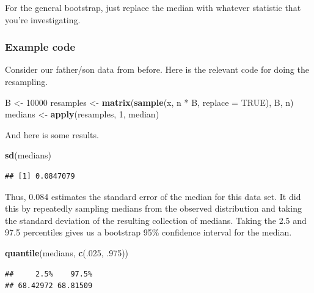 \documentclass[]{article}
\newenvironment{Shaded}{\begin{snugshade}}{\end{snugshade}}
\newcommand{\KeywordTok}[1]{\textcolor[rgb]{0.13,0.29,0.53}{\textbf{{#1}}}}
\newcommand{\DataTypeTok}[1]{\textcolor[rgb]{0.13,0.29,0.53}{{#1}}}
\newcommand{\DecValTok}[1]{\textcolor[rgb]{0.00,0.00,0.81}{{#1}}}
\newcommand{\StringTok}[1]{\textcolor[rgb]{0.31,0.60,0.02}{{#1}}}
\newcommand{\OtherTok}[1]{\textcolor[rgb]{0.56,0.35,0.01}{{#1}}}
\newcommand{\NormalTok}[1]{{#1}}
\begin{document}
For the general bootstrap, just replace the median with whatever
statistic that you're investigating.

\subsubsection{Example code}\label{example-code}

Consider our father/son data from before. Here is the relevant code for
doing the resampling.

\begin{Shaded}
\begin{Highlighting}[]
\NormalTok{B <-}\StringTok{ }\DecValTok{10000}
\NormalTok{resamples <-}\StringTok{ }\KeywordTok{matrix}\NormalTok{(}\KeywordTok{sample}\NormalTok{(x,}
                           \NormalTok{n *}\StringTok{ }\NormalTok{B,}
                           \DataTypeTok{replace =} \OtherTok{TRUE}\NormalTok{),}
                    \NormalTok{B, n)}
\NormalTok{medians <-}\StringTok{ }\KeywordTok{apply}\NormalTok{(resamples, }\DecValTok{1}\NormalTok{, median)}
\end{Highlighting}
\end{Shaded}

And here is some results.

\begin{Shaded}
\begin{Highlighting}[]
\KeywordTok{sd}\NormalTok{(medians)}
\end{Highlighting}
\end{Shaded}

\begin{verbatim}
## [1] 0.0847079
\end{verbatim}

Thus, 0.084 estimates the standard error of the median for this data
set. It did this by repeatedly sampling medians from the observed
distribution and taking the standard deviation of the resulting
collection of medians. Taking the 2.5 and 97.5 percentiles gives us a
bootstrap 95\% confidence interval for the median.

\begin{Shaded}
\begin{Highlighting}[]
\KeywordTok{quantile}\NormalTok{(medians, }\KeywordTok{c}\NormalTok{(.}\DecValTok{025}\NormalTok{, .}\DecValTok{975}\NormalTok{))}
\end{Highlighting}
\end{Shaded}

\begin{verbatim}
##     2.5%    97.5% 
## 68.42972 68.81509
\end{verbatim}
\end{document}

